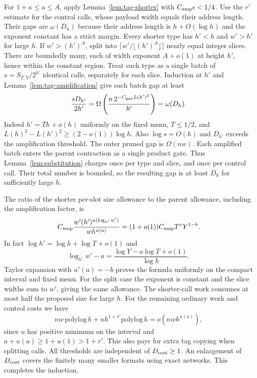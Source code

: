 For $1+\kappa\le a\le A$, apply Lemma~\ref{lem:tag-shorter} with
$C_{\rm amp}\epsilon<1/4$. Use the $r'$ estimate for the control calls, whose payload
width equals their address length. Their gaps are $\omega(D_h)$ because their address
length is $h+O(\log h)$ and the exponent constant has a strict margin.
Every shorter type has $h'<h$ and $w'>h'$ for large $h$. If
$w'>(h')^A$, split into
$\lceil w'/\lfloor(h')^A\rfloor\rceil$ nearly equal integer slices.
There are boundedly many, each of width exponent $A+o(1)$ at height
$h'$, hence within the constant region. Treat each type as a single
batch of $s=S_{T,Y}/2^{h'}$ identical calls, separately for each
slice. Induction at $h'$ and Lemma~\ref{lem:tag-amplification} give
each batch gap at least
\[
          \frac{sD_{h'}}{2h'}
           =\Omega\left(\frac{n\,2^{-C_{\rm gap}L(h')^2}}{h'}\right)
           =\omega(D_h).
\]
Indeed $h'=Th+o(h)$ uniformly on the fixed menu, $T\le1/2$, and
$L(h)^2-L(h')^2\ge(2-o(1))\log h$. Also $\log s=O(h)$ and $D_{h'}$
exceeds the amplification threshold. The outer pruned gap is $\Omega(nw)$. Each amplified batch enters
the parent contraction as a single product gate. Thus
Lemma~\ref{lem:substitution} charges once per type and slice, and once
per control call. Their total number is bounded, so the resulting gap
is at least $D_h$ for sufficiently large $h$.

The ratio of the shorter per-slot size allowance to the parent allowance,
including the amplification factor, is
\[
 C_{\rm amp}\frac{w'(h')^{u(\log_{h'} w')}}{w h^{u(a)}}
        =(1+o(1)) C_{\rm amp}T^vY^{1-b}.
\]
In fact $\log h'=\log h+\log T+o(1)$ and
\[
 \log_{h'}w'-a=\frac{\log Y-a\log T+o(1)}{\log h}.
\]
Taylor expansion with $u'(a)=-b$ proves the formula uniformly on the
compact interval and fixed menu. For the split case the exponent is
constant and the slice widths sum to $w'$, giving the same allowance.
The shorter-call work consumes at most half the proposed size for large
$h$. For the remaining ordinary work and control costs we have
\[
 nw\,\mathrm{polylog}\,h+nh^{1+r'}\mathrm{polylog}\,h
                      =o(nwh^{u(a)}),
\]
since $u$ has positive minimum on the interval and
$a+u(a)\ge1+u(1)>1+r'$. This also pays for extra tag copying when
splitting calls. All thresholds are independent of $D_{\rm cost}\ge1$.
An enlargement of $D_{\rm cost}$ covers the finitely many smaller
formats using exact networks. This completes the induction.

